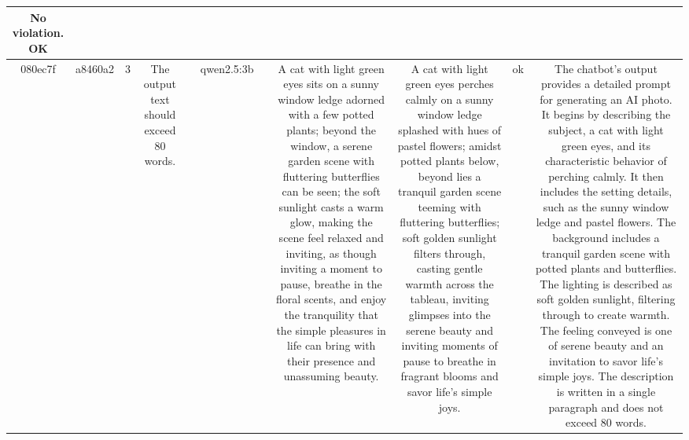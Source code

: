 \begin{table}[h!]
\begin{tabular}{|c|c|c|c|c|c|c|c|c|c|c|}
No violation.
OK\\
\hline
080ec7f & a8460a2 & 3 & The output text should exceed 80 words. &  & qwen2.5:3b &  & A cat with light green eyes sits on a sunny window ledge adorned with a few potted plants; beyond the window, a serene garden scene with fluttering butterflies can be seen; the soft sunlight casts a warm glow, making the scene feel relaxed and inviting, as though inviting a moment to pause, breathe in the floral scents, and enjoy the tranquility that the simple pleasures in life can bring with their presence and unassuming beauty. & A cat with light green eyes perches calmly on a sunny window ledge splashed with hues of pastel flowers; amidst potted plants below, beyond lies a tranquil garden scene teeming with fluttering butterflies; soft golden sunlight filters through, casting gentle warmth across the tableau, inviting glimpses into the serene beauty and inviting moments of pause to breathe in fragrant blooms and savor life's simple joys. & ok & The chatbot's output provides a detailed prompt for generating an AI photo. It begins by describing the subject, a cat with light green eyes, and its characteristic behavior of perching calmly. It then includes the setting details, such as the sunny window ledge and pastel flowers. The background includes a tranquil garden scene with potted plants and butterflies. The lighting is described as soft golden sunlight, filtering through to create warmth. The feeling conveyed is one of serene beauty and an invitation to savor life's simple joys. The description is written in a single paragraph and does not exceed 80 words. 


\end{tabular}
\end{table}
